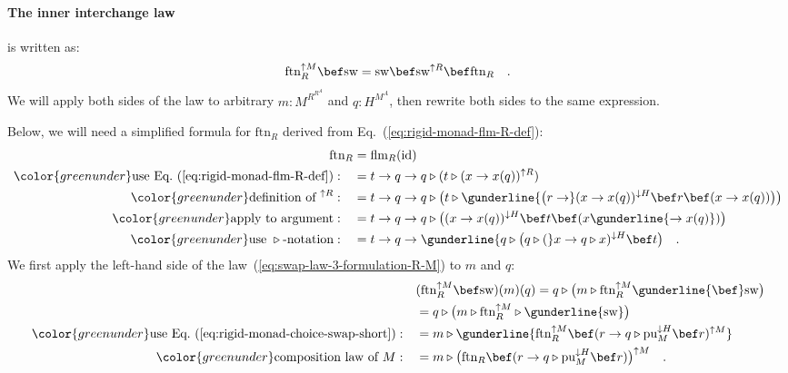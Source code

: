 \paragraph{The inner interchange law}

is written as:
\begin{equation}
\text{ftn}_{R}^{\uparrow M}\bef\text{sw}=\text{sw}\bef\text{sw}^{\uparrow R}\bef\text{ftn}_{R}\quad.\label{eq:swap-law-3-formulation-R-M}
\end{equation}
We will apply both sides of the law to arbitrary $m:M^{R^{R^{A}}}$
and $q:H^{M^{A}}$, then rewrite both sides to the same expression. 

Below, we will need a simplified formula for $\text{ftn}_{R}$ derived
from Eq.~(\ref{eq:rigid-monad-flm-R-def}):
\begin{align}
\text{ftn}_{R} & =\text{flm}_{R}(\text{id})\nonumber \\
{\color{greenunder}\text{use Eq.~(\ref{eq:rigid-monad-flm-R-def})}:}\quad & =t\rightarrow q\rightarrow q\triangleright(t\triangleright(x\rightarrow x(q))^{\uparrow R})\nonumber \\
{\color{greenunder}\text{definition of }^{\uparrow R}:}\quad & =t\rightarrow q\rightarrow q\triangleright\big(t\triangleright\gunderline{\big(r\rightarrow}(x\rightarrow x(q))^{\downarrow H}\bef r\bef(x\rightarrow x(q))\big)\big)\nonumber \\
{\color{greenunder}\text{apply to argument}:}\quad & =t\rightarrow q\rightarrow q\triangleright\big((x\rightarrow x(q))^{\downarrow H}\bef t\bef(x\gunderline{\rightarrow x(q)})\big)\nonumber \\
{\color{greenunder}\text{use }\triangleright\text{-notation}:}\quad & =t\rightarrow q\rightarrow\gunderline{q\triangleright\big(q\triangleright(}x\rightarrow q\triangleright x)^{\downarrow H}\bef t\big)\quad.\label{eq:ftn-R-simplified}
\end{align}
We first apply the left-hand side of the law~(\ref{eq:swap-law-3-formulation-R-M})
to $m$ and $q$:
\begin{align*}
 & (\text{ftn}_{R}^{\uparrow M}\bef\text{sw})(m)(q)=q\triangleright\big(m\triangleright\text{ftn}_{R}^{\uparrow M}\gunderline{\bef}\text{sw}\big)\\
 & =q\triangleright\big(m\triangleright\text{ftn}_{R}^{\uparrow M}\triangleright\gunderline{\text{sw}}\big)\\
{\color{greenunder}\text{use Eq.~(\ref{eq:rigid-monad-choice-swap-short})}:}\quad & =m\triangleright\gunderline{\text{ftn}_{R}^{\uparrow M}\bef(r\rightarrow q\triangleright\text{pu}_{M}^{\downarrow H}\bef r)^{\uparrow M}}\\
{\color{greenunder}\text{composition law of }M:}\quad & =m\triangleright\big(\text{ftn}_{R}\bef(r\rightarrow q\triangleright\text{pu}_{M}^{\downarrow H}\bef r)\big)^{\uparrow M}\quad.
\end{align*}
